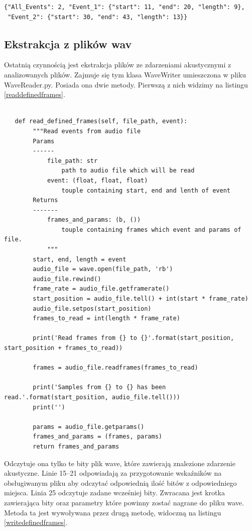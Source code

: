 \documentclass[eng,printmode]{mgr}
\begin{document}
\begin{lstlisting}[caption={Przykładowa zawartość pliku .json},captionpos=b,label={jsoncontent}] 
{"All_Events": 2, "Event_1": {"start": 11, "end": 20, "length": 9},
 "Event_2": {"start": 30, "end": 43, "length": 13}}
\end{lstlisting}

\subsection{Ekstrakcja z plików wav}
Ostatnią czynnością jest ekstrakcja plików ze zdarzeniami akustycznymi z analizowanych plików. Zajmuje się tym klasa WaveWriter umieszczona w pliku WaveReader.py. Posiada ona dwie metody. Pierwszą z nich widzimy na listingu \ref{readdefinedframes}.


\begin{minipage}{\linewidth}
\begin{lstlisting}[caption={fragment kodu źródłowego pliku WaveReader.py, klasa WaveWriter, metoda read\_defined\_frames},captionpos=b,label={readdefinedframes}] 

   def read_defined_frames(self, file_path, event):
        """Read events from audio file
        Params
        ------
            file_path: str
                path to audio file which will be read
            event: (float, float, float)
                touple containing start, end and lenth of event
        Returns
        -------
            frames_and_params: (b, ())
                touple containing frames which event and params of file.
            """
        start, end, length = event
        audio_file = wave.open(file_path, 'rb')
        audio_file.rewind()
        frame_rate = audio_file.getframerate()
        start_position = audio_file.tell() + int(start * frame_rate)
        audio_file.setpos(start_position)
        frames_to_read = int(length * frame_rate)

        print('Read frames from {} to {}'.format(start_position, start_position + frames_to_read))

        frames = audio_file.readframes(frames_to_read)

        print('Samples from {} to {} has been read.'.format(start_position, audio_file.tell()))
        print('')

        params = audio_file.getparams()
        frames_and_params = (frames, params)
        return frames_and_params
\end{lstlisting}
\end{minipage}
Odczytuje ona tylko te bity plik wave, które zawierają znalezione zdarzenie akustyczne. Linie 15--21 odpowiadają za przygotowanie wskaźników na obsługiwanym pliku aby odczytać odpowiednią ilość bitów z odpowiedniego miejsca. Linia 25 odczytuje zadane wcześniej bity. Zwracana jest krotka zawierająca bity oraz parametry które powinny zostać nagrane do pliku wave. Metoda ta jest wywoływana przez drugą metodę, widoczną na listingu \ref{writedefinedframes}.
\end{document}
